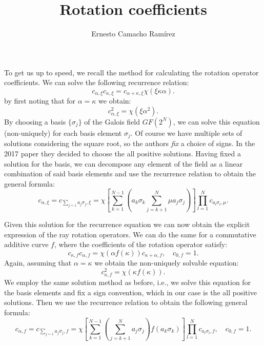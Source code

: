 \documentclass[a4paper]{article}
\title{Rotation coefficients}
\author{Ernesto Camacho Ramírez}
\begin{document}
  \maketitle

  To get us up to speed, we recall the method for
  calculating the rotation operator coefficients. We can
  solve the following recurrence relation:
  \begin{equation}
    c_{\alpha,\xi} c_{\kappa,\xi}
    = c_{\alpha+\kappa,\xi} \chi(\xi\kappa\alpha).
  \end{equation}
  by first noting that for $\alpha = \kappa$ we obtain:
  \begin{equation}
    c_{\alpha,\xi}^2 = \chi(\xi\alpha^2).
  \end{equation}
  By choosing a basis $\{\sigma_j\}$ of the Galois field
  $GF(2^N)$, we can solve this equation (non-uniquely) for
  each basis element $\sigma_j$. Of course we have multiple
  sets of solutions considering the square root, so the
  authors \textit{fix} a choice of signs. In the 2017 paper
  they decided to choose the all positive solutions. Having
  fixed a solution for the basis, we can decompose any
  element of the field as a linear combination of said basis
  elements and use the recurrence relation to obtain the
  general formula:
  \begin{equation}
    c_{\alpha,\xi}
    = c_{\sum_{j=1}^{} a_j \sigma_j,\xi}
    = \chi\left[
    \sum_{k=1}^{N-1} \left(
      a_k \sigma_k
      \sum_{j=k+1}^{N} \mu a_j \sigma_j
    \right) \right]
    \prod_{l=1}^N c_{a_l \sigma_l, \mu}.
  \end{equation}

  Given this solution for the recurrence equation we can now
  obtain the explicit expression of the ray rotation
  operators. We can do the same for a commutative additive
  curve $f$, where the coefficients of the rotation operator
  satisfy:
  \begin{equation}
    c_{\kappa,f} c_{\alpha,f}
    = \chi(\alpha f(\kappa)) c_{\kappa+\alpha,f},
    \quad c_{0,f} = 1.
  \end{equation}
  Again, assuming that $\alpha = \kappa$ we obtain the
  non-uniquely solvable equation:
  \begin{equation}
    c_{\kappa,f}^2 = \chi(\kappa f(\kappa)).
  \end{equation}
  We employ the same solution method as before, i.e., we
  solve this equation for the basis elements and fix a sign
  convention, which in our case is the all positive
  solutions. Then we use the recurrence relation to obtain
  the following general formula:
  \begin{equation}
    c_{\alpha,f}
    = c_{\sum_{j=1} a_j \sigma_j, f}
    = \chi\left[
    \sum_{k=1}^{N-1} \left(\sum_{j=k+1}^N a_j
    \sigma_j\right) f(a_k \sigma_k) \right] \prod_{l=1}^N
    c_{a_l \sigma_l, f}  , \quad c_{0,f} = 1.
  \end{equation}
 
\end{document}
